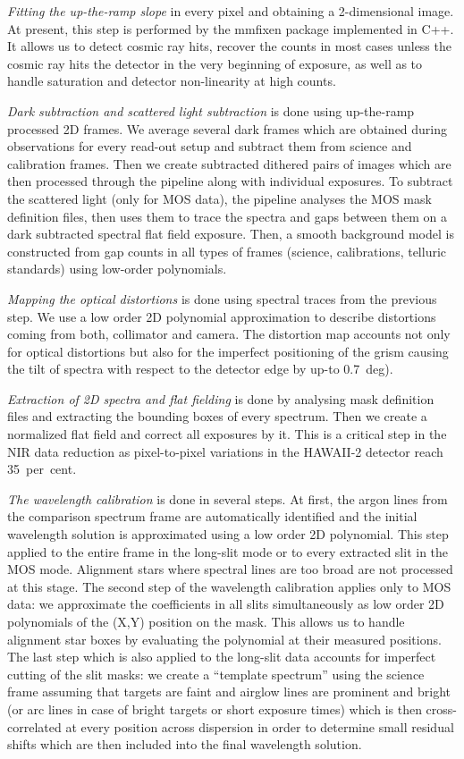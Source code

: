  \emph{Fitting the up-the-ramp slope} in every pixel and obtaining a
2-dimensional image. At present, this step is performed by the {\sc
mmfixen} package implemented in {\sc C++}. It allows us to detect cosmic ray
hits, recover the counts in most cases unless the cosmic ray hits the
detector in the very beginning of exposure, as well as to handle saturation
and detector non-linearity at high counts.

 \emph{Dark subtraction and scattered light subtraction} is done using
up-the-ramp processed 2D frames.  We average several dark frames which are
obtained during observations for every read-out setup and subtract them from
science and calibration frames.  Then we create subtracted dithered pairs of
images which are then processed through the pipeline along with individual
exposures.  To subtract the scattered light (only for MOS data), the
pipeline analyses the MOS mask definition files, then uses them to trace the
spectra and gaps between them on a dark subtracted spectral flat field
exposure.  Then, a smooth background model is constructed from gap counts in
all types of frames (science, calibrations, telluric standards) using
low-order polynomials.

 \emph{Mapping the optical distortions} is done using spectral traces
from the previous step.  We use a low order 2D polynomial approximation to
describe distortions coming from both, collimator and camera. The distortion
map accounts not only for optical distortions but also for the imperfect
positioning of the grism causing the tilt of spectra with respect to the
detector edge by up-to 0.7~deg).

 \emph{Extraction of 2D spectra and flat fielding} is done by analysing mask
definition files and extracting the bounding boxes of every spectrum.  Then
we create a normalized flat field and correct all exposures by it.  This is
a critical step in the NIR data reduction as pixel-to-pixel variations
in the HAWAII-2 detector reach 35~per~cent.

 \emph{The wavelength calibration} is done in several steps. At first,
the argon lines from the comparison spectrum frame are automatically
identified and the initial wavelength solution is approximated using a low
order 2D polynomial.  This step applied to the entire frame in the long-slit
mode or to every extracted slit in the MOS mode.  Alignment stars where
spectral lines are too broad are not processed at this stage.  The second
step of the wavelength calibration applies only to MOS data: we approximate
the coefficients in all slits simultaneously as low order 2D polynomials of
the (X,Y) position on the mask.  This allows us to handle alignment star
boxes by evaluating the polynomial at their measured positions.  The last
step which is also applied to the long-slit data accounts for imperfect
cutting of the slit masks: we create a ``template spectrum'' using the
science frame assuming that targets are faint and airglow lines are
prominent and bright (or arc lines in case of bright targets or short
exposure times) which is then cross-correlated at every position across
dispersion in order to determine small residual shifts which are then
included into the final wavelength solution.


